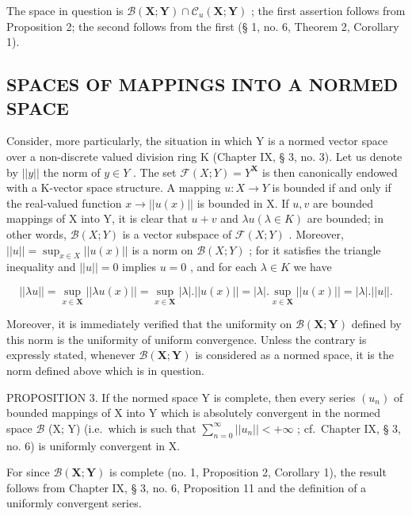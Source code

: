The space in question is \(\mathcal{B}(\mathbf{X};\mathbf{Y})\cap \mathcal{C}_u(\mathbf{X};\mathbf{Y})\) ; the first assertion follows from Proposition 2; the second follows from the first (§ 1, no. 6, Theorem 2, Corollary 1).

\subsection{SPACES OF MAPPINGS INTO A NORMED SPACE}

Consider, more particularly, the situation in which Y is a normed vector space over a non-discrete valued division ring K (Chapter IX, § 3, no. 3). Let us denote by \(||y||\) the norm of \(y \in Y\) . The set \(\mathcal{F}(X;Y) = Y^{\mathbf{X}}\) is then canonically endowed with a K-vector space structure. A mapping \(u: X \to Y\) is bounded if and only if the real-valued function \(x \to ||u(x)||\) is bounded in X. If \(u, v\) are bounded mappings of X into Y, it is clear that \(u + v\) and \(\lambda u (\lambda \in K)\) are bounded; in other words, \(\mathcal{B}(X;Y)\) is a vector subspace of \(\mathcal{F}(X;Y)\) . Moreover, \(||u|| = \sup_{x \in X} ||u(x)||\) is a norm on \(\mathcal{B}(X;Y)\) ; for it satisfies the triangle inequality and \(||u|| = 0\) implies \(u = 0\) , and for each \(\lambda \in K\) we have

\[
| | \lambda u | | = \sup _ {x \in \mathbf {X}} | | \lambda u (x) | | = \sup _ {x \in \mathbf {X}} | \lambda |. | | u (x) | | = | \lambda |. \sup _ {x \in \mathbf {X}} | | u (x) | | = | \lambda |. | | u | |.
\]

Moreover, it is immediately verified that the uniformity on \(\mathcal{B}(\mathbf{X};\mathbf{Y})\) defined by this norm is the uniformity of uniform convergence. Unless the contrary is expressly stated, whenever \(\mathcal{B}(\mathbf{X};\mathbf{Y})\) is considered as a normed space, it is the norm defined above which is in question.

PROPOSITION 3. If the normed space Y is complete, then every series \((u_n)\) of bounded mappings of X into Y which is absolutely convergent in the normed space \(\mathcal{B}\) (X; Y) (i.e.~which is such that \(\sum_{n=0}^{\infty}||u_n|| < +\infty\) ; cf.~Chapter IX, § 3, no. 6) is uniformly convergent in X.

For since \(\mathcal{B}(\mathbf{X};\mathbf{Y})\) is complete (no. 1, Proposition 2, Corollary 1), the result follows from Chapter IX, § 3, no. 6, Proposition 11 and the definition of a uniformly convergent series.

